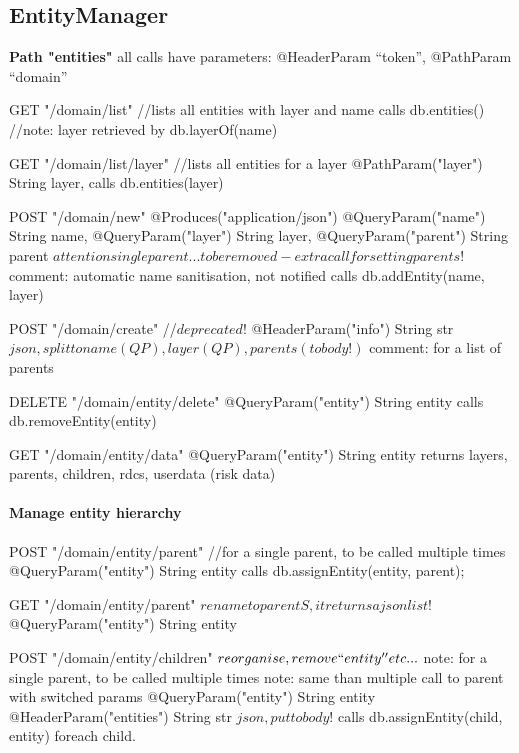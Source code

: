 \subsection{EntityManager}

\textbf{Path "entities"}
all calls have parameters: 
    @HeaderParam ``token'', 
    @PathParam ``domain''
   
   GET "/{domain}/list"  //lists all entities with layer and name
    calls db.entities()    //note: layer retrieved by db.layerOf(name)
    
    GET "/{domain}/list/{layer}"  //lists all entities for a layer
	@PathParam("layer") String layer, 
	calls db.entities(layer)
	
    POST "/{domain}/new"
      @Produces("application/json")
      @QueryParam("name") String name, 
      @QueryParam("layer") String layer, 
      @QueryParam("parent") String parent  $attention single parent...to be removed - extra call for setting parents!$
      comment: automatic name sanitisation, not notified
	calls db.addEntity(name, layer)
	
	POST "/{domain}/create"   //$deprecated!$
	  @HeaderParam("info") String str  $json, split to name (QP), layer (QP), parents (to body!)$
	  comment: for a list of parents
	  
	DELETE "/{domain}/entity/delete"
	  @QueryParam("entity") String entity
	  calls db.removeEntity(entity)
	  
	GET "/{domain}/entity/data"
	  @QueryParam("entity") String entity
	returns layers, parents, children, rdcs, userdata (risk data)

\paragraph{Manage entity hierarchy} 	  
      POST "/{domain}/entity/parent"  //for a single parent, to be called multiple times
	  @QueryParam("entity") String entity
	  calls db.assignEntity(entity, parent);

      GET "/{domain}/entity/parent"  $rename to parentS, it returns a json list!$
	  @QueryParam("entity") String entity
	  
      POST "/{domain}/entity/children"  $reorganise, remove ``entity'' etc...$ 
	  note: for a single parent, to be called multiple times
	  note: same than multiple call to parent with switched params
	  @QueryParam("entity") String entity
	  @HeaderParam("entities") String str  $json, put to body!$
	  calls db.assignEntity(child, entity) foreach child.
	  
